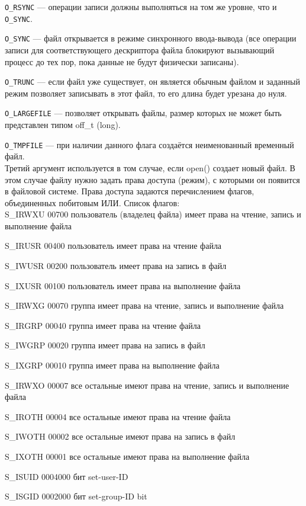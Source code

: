 \documentclass[a4paper,14pt]{extreport}
\begin{document}
\texttt{O\_RSYNC} --- операции записи должны выполняться на том же уровне, что и \texttt{O\_SYNC}.

\texttt{O\_SYNC} --- файл открывается в режиме синхронного ввода-вывода (все операции записи для соответствующего дескриптора файла блокируют вызывающий процесс до тех пор, пока данные не будут физически записаны).

\texttt{O\_TRUNC} --- если файл уже существует, он является обычным файлом и заданный режим позволяет записывать в этот файл, то его длина будет урезана до нуля.

\texttt{O\_LARGEFILE} --- позволяет открывать файлы, размер которых не может быть представлен типом off\_t (long).

\texttt{O\_TMPFILE} --- при наличии данного флага создаётся неименованный временный файл.\\


Третий аргумент используется в том случае, если open() создает новый файл. В этом случае файлу нужно задать права доступа (режим), с которыми он появится в файловой системе. Права доступа задаются перечислением флагов, объединенных побитовым ИЛИ. Список флагов:\\ 

S\_IRWXU 00700 пользователь (владелец файла) имеет права на чтение, запись и выполнение файла

S\_IRUSR 00400 пользователь имеет права на чтение файла

S\_IWUSR 00200 пользователь имеет права на запись в файл

S\_IXUSR 00100 пользователь имеет права на выполнение файла

S\_IRWXG 00070 группа имеет права на чтение, запись и выполнение файла

S\_IRGRP 00040 группа имеет права на чтение файла

S\_IWGRP 00020 группа имеет права на запись в файл

S\_IXGRP 00010 группа имеет права на выполнение файла

S\_IRWXO 00007 все остальные имеют права на чтение, запись и выполнение файла

S\_IROTH 00004 все остальные имеют права на чтение файла

S\_IWOTH 00002 все остальные имеют права на запись в файл

S\_IXOTH 00001 все остальные имеют права на выполнение файла

S\_ISUID 0004000 бит set-user-ID

S\_ISGID 0002000 бит set-group-ID bit 
\end{document}
